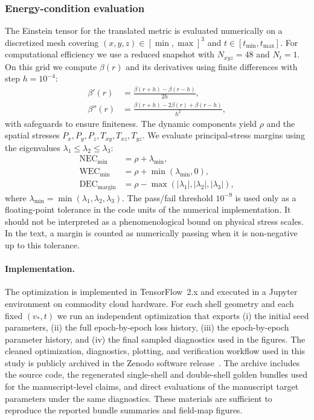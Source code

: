\documentclass[11pt]{article}
\begin{document}
\subsubsection{Energy-condition evaluation}
The Einstein tensor for the translated metric is evaluated numerically on a discretized mesh covering $(x,y,z)\in[\min,\max]^3$ and $t\in[t_{\min},t_{\max}]$. For computational efficiency we use a reduced snapshot with $N_{xyz}=48$ and $N_t=1$. On this grid we compute $\beta(r)$ and its derivatives using finite differences with step $h=10^{-4}$:
\begin{align}
\beta'(r) &= \frac{\beta(r+h) - \beta(r-h)}{2h}, \\
\beta''(r) &= \frac{\beta(r+h) - 2\beta(r) + \beta(r-h)}{h^2},
\end{align}
with safeguards to ensure finiteness. The dynamic components yield $\rho$ and the spatial stresses $P_x,P_y,P_z,T_{xy},T_{xz},T_{yz}$. We evaluate principal-stress margins using the eigenvalues $\lambda_1\le\lambda_2\le\lambda_3$:
\begin{align}
\text{NEC}_{\min} &= \rho + \lambda_{\min}, \\
\text{WEC}_{\min} &= \rho + \min(\lambda_{\min}, 0), \\
\text{DEC}_{\text{margin}} &= \rho - \max(|\lambda_1|, |\lambda_2|, |\lambda_3|),
\end{align}
where $\lambda_{\min}=\min(\lambda_1,\lambda_2,\lambda_3)$. 
The pass/fail threshold $10^{-9}$ is used only as a floating-point tolerance in the code units of the numerical implementation. It should not be interpreted as a phenomenological bound on physical stress scales. In the text, a margin is counted as numerically passing when it is non-negative up to this tolerance.

\paragraph{Implementation.}

The optimization is implemented in TensorFlow~2.x and executed in a Jupyter environment on commodity cloud hardware. For each shell geometry and each fixed $(v_*,t)$ we run an independent optimization that exports (i) the initial seed parameters, (ii) the full epoch-by-epoch loss history, (iii) the epoch-by-epoch parameter history, and (iv) the final sampled diagnostics used in the figures. The cleaned optimization, diagnostics, plotting, and verification workflow used in this study is publicly archived in the Zenodo software release~\citep{Bolivar_Abellan_Vasilev_2026_warp_optimization}. The archive includes the source code, the regenerated single-shell and double-shell golden bundles used for the manuscript-level claims, and direct evaluations of the manuscript target parameters under the same diagnostics. These materials are sufficient to reproduce the reported bundle summaries and field-map figures.
\end{document}
